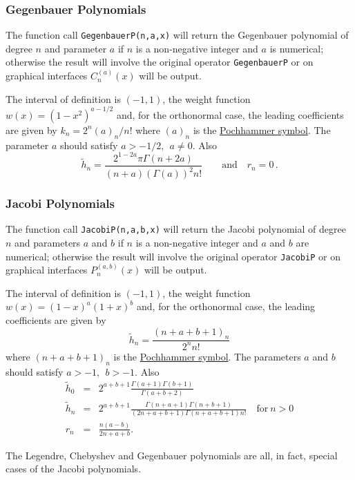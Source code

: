 \subsubsection{Gegenbauer Polynomials}
\hypertarget{GEGENBAUERP}{}
 
The function call \texttt{GegenbauerP(n,a,x)} will return the Gegenbauer
polynomial of degree $n$ and parameter $a$ if $n$ is a non-negative integer
and $a$ is numerical; otherwise the result will involve the original operator
\texttt{GegenbauerP} or on graphical interfaces $C_n^{(a)}(x)$ will be output.

The interval of definition is $(-1, 1)$, the weight function
$w(x)=(1-x^2)^{a-1/2}$ and, for the orthonormal case, the leading
coefficients are given by $k_n= 2^n (a)_n/n!$ where $(a)_n$ is the
\hyperlink{POCH}{Pochhammer symbol}.
The parameter $a$ should satisfy $a >-1/2,\ \ a \neq 0$. Also
\[\tilde{h}_n = \frac{2^{1-2 a}\pi \Gamma(n+2a)}{(n+a)(\Gamma(a))^2n!}\qquad
\mbox{and}\quad r_n=0\,.\]

\subsubsection{Jacobi Polynomials}
\hypertarget{JACOBIP}{}
 
The function call \texttt{JacobiP(n,a,b,x)} will return the Jacobi
polynomial of degree $n$ and parameters $a$ and $b$ if $n$ is a non-negative
integer  and $a$ and $b$ are numerical; otherwise the result will involve
the original operator \texttt{JacobiP} or on graphical interfaces
$P_n^{(a, b)}(x)$ will be output.

The interval of definition is $(-1, 1)$, the weight function
$w(x)=(1-x)^a(1+x)^b$ and, for the orthonormal case, the leading
coefficients are given by
\[\tilde{h}_n = \frac{(n+a+b+1)_n}{2^nn!}\]
where $(n+a+b+1)_n$ is the \hyperlink{POCH}{Pochhammer symbol}.
The parameters $a$ and $b$ should satisfy $a >-1,\ \ b > -1$. Also
\begin{eqnarray*}
\tilde{h}_0 & = & 2^{a+b+1}\frac{\Gamma(a+1)\Gamma(b+1)}{\Gamma(a+b+2)}\\
\tilde{h}_n & = & 2^{a+b+1}\frac{\Gamma(n+a+1)\Gamma(n+b+1)}{(2 n +a+b+1)
\Gamma(n+a+b+1)n!}\quad \mbox{for}\ n>0\\
r_n & = & \frac{n(a-b)}{2n+a+b}.
\end{eqnarray*}

The Legendre, Chebyshev and Gegenbauer polynomials are all, in fact, special
cases of the Jacobi polynomials.

